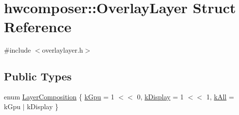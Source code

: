 \hypertarget{structhwcomposer_1_1OverlayLayer}{}\section{hwcomposer\+:\+:Overlay\+Layer Struct Reference}
\label{structhwcomposer_1_1OverlayLayer}


{\ttfamily \#include $<$overlaylayer.\+h$>$}

\subsection*{Public Types}
\begin{DoxyCompactItemize}
\item 
enum \mbox{\hyperlink{structhwcomposer_1_1OverlayLayer_a937ae4fd43f1005ad8c0c89a9673f1e1}{Layer\+Composition}} \{ \mbox{\hyperlink{structhwcomposer_1_1OverlayLayer_a937ae4fd43f1005ad8c0c89a9673f1e1a6ee064d87ae6078bfc5c2de8cc4cd29b}{k\+Gpu}} = 1 $<$$<$ 0, 
\mbox{\hyperlink{structhwcomposer_1_1OverlayLayer_a937ae4fd43f1005ad8c0c89a9673f1e1af648548e814dc8e01fbe35d1679861c9}{k\+Display}} = 1 $<$$<$ 1, 
\mbox{\hyperlink{structhwcomposer_1_1OverlayLayer_a937ae4fd43f1005ad8c0c89a9673f1e1ab3528b5e808213bdd5961276986e9f5d}{k\+All}} = k\+Gpu $\vert$ k\+Display
 \}
\end{DoxyCompactItemize}
